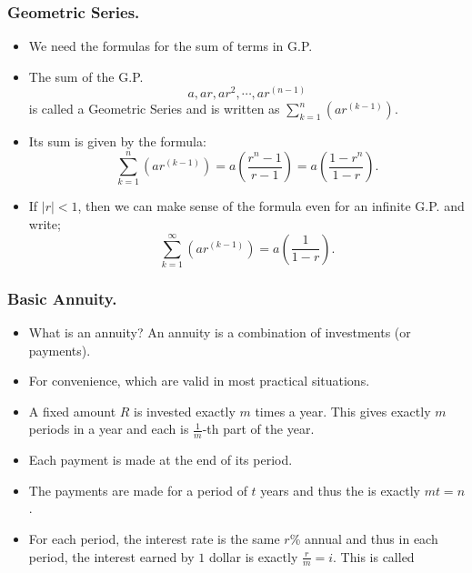 \begin{frame}%
  \frametitle{Geometric Series.}
  \begin{itemize}%
 
\item We need the formulas  for the sum of terms in G.P. 

\item The sum of the G.P. $$a,ar, ar^2,\cdots , ar^{(n-1)}$$
is called a  Geometric Series and is written as
$\displaystyle \sum_{k=1}^n (ar^{(k-1)})$.

\item
Its sum is given by the formula:
$$\sum_{k=1}^n (ar^{(k-1)}) =a\left(\frac{r^n-1}{r-1}\right)
= a\left(\frac{1-r^n}{1-r}\right).$$
\item If $|r|<1$, then we can make sense of the formula even for an
infinite G.P. and write;
$$\sum_{k=1}^\infty (ar^{(k-1)}) =a\left(\frac{1}{1-r}\right).$$

\end{itemize}
\end{frame}

%


\begin{frame}%
  \frametitle{Basic Annuity.}
  \begin{itemize}%
 
\item What is an annuity?  An annuity is  a combination of investments
(or payments).
\item For convenience, which
are valid in most practical situations.
\item A fixed amount $R$ is invested exactly $m$ times a year.
This gives exactly $m$ periods in a year and each is $\frac{1}{m}$-th
part of the year.
\item Each payment is made at the end of its period.
\item The payments are made for a period of $t$ years and thus the
 is exactly $mt=n$.
\item For each period, the interest rate is the same $r$\% annual and
thus in each period, the interest earned by $1$ dollar is exactly
$\frac{r}{m} = i$. This is called 

\end{itemize}
\end{frame}

%

